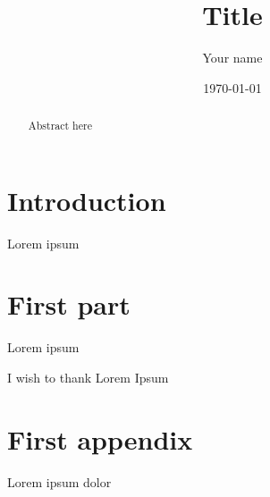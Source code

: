 \documentclass[
 reprint,
 preprintnumbers,
 amsmath,amssymb,
 aps,pra
]{revtex4-2}
\begin{document}

\title{Title}

\author{Your name}

\date{\today}

\begin{abstract}
    Abstract here
\end{abstract}

\maketitle

\section*{Introduction}

Lorem ipsum \cite{Wheeler1949}

\section{First part}

Lorem ipsum

\begin{acknowledgments}
    I wish to thank Lorem Ipsum
\end{acknowledgments}


\appendix


\section{First appendix}

Lorem ipsum dolor



\end{document}
